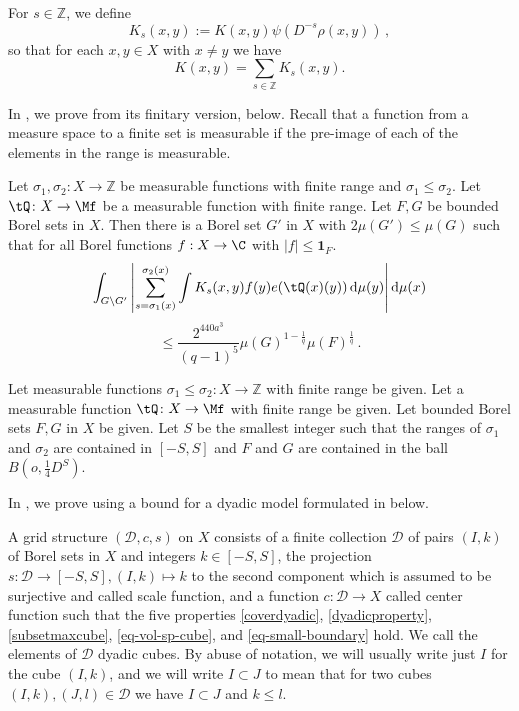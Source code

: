 For $s\in\mathbb{Z}$, we define
\begin{equation}\label{defks}
    K_s(x,y):=K(x,y)\psi(D^{-s}\rho(x,y))\,,
\end{equation}
so that for each $x, y \in X$ with $x\neq y$ we have
$$K(x,y)=\sum_{s\in\mathbb{Z}}K_s(x,y).$$

In , we prove 
from its finitary version,  below. Recall
that a function from a measure space to a finite set is measurable if the pre-image of each of the elements in the range is measurable.


\begin{proposition}
\label{finitary-Carleson}
\leanok
{}
Let ${\sigma_1},\sigma_2\colon X\to \mathbb{Z}$ be measurable functions with finite range and ${\sigma_1}\leq \sigma_2$. Let $\tQ\colon X\to \Mf$ be a measurable function with finite range. Let $F,G$ be bounded Borel sets in $X$. Then there is a Borel set $G'$ in $X$ with $2\mu(G')\leq \mu(G)$ such that
for all Borel functions $f:X\to \C$ with $|f|\le \mathbf{1}_F$.
\begin{equation*}
    \int_{G \setminus G'} \left|\sum_{s={\sigma_1}(x)}^{{\sigma_2}(x)} \int K_s(x,y) f(y) e(\tQ(x)(y)) \, \mathrm{d}\mu(y) \right| \mathrm{d}\mu(x)
\end{equation*}
\begin{equation}
    \label{eq-linearized}
    \le \frac{2^{440a^3}}{(q-1)^5} \mu(G)^{1-\frac{1}{q}}
     \mu(F)^{\frac 1 q}\,.
\end{equation}
\end{proposition}
Let measurable functions ${\sigma_1}\leq \sigma_2\colon X\to \mathbb{Z}$ with finite range be given. Let a measurable function
$\tQ\colon X\to \Mf$ with finite range
be given.
Let bounded Borel sets $F,G$ in $X$ be given.
Let $S$ be the smallest integer such that the ranges of
$\sigma_1$ and $\sigma_2$ are contained in $[-S,S]$ and $F$ and $G$ are contained
in the ball $B(o, \frac{1}{4}D^S)$.

In , we prove  using a
bound for a dyadic model formulated in  below.


A grid structure $(\mathcal{D}, c, s)$ on $X$ consists of a finite collection $\mathcal{D}$ of pairs $(I, k)$ of Borel
sets in $X$ and integers $k \in [-S, S]$, the projection $s\colon \mathcal{D}\to [-S, S], (I, k) \mapsto k$ to the second component which is assumed to be surjective and
called scale function, and a function $c:\mathcal{D}\to X$
called center function such that the five properties
\eqref{coverdyadic}, \eqref{dyadicproperty}, \eqref{subsetmaxcube},
\eqref{eq-vol-sp-cube}, and \eqref{eq-small-boundary} hold. We call the elements of $\mathcal{D}$ dyadic cubes. By abuse of notation, we will usually write just $I$ for the cube $(I,k)$, and we will write $I \subset J$ to mean that for two cubes $(I,k), (J, l) \in \mathcal{D}$ we have $I \subset J$ and $k \le l$.

